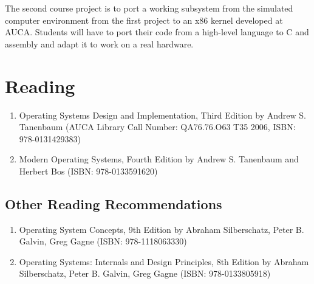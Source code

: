 \documentclass[12pt,a4paper,oneside]{article}
\begin{document}
        The second course project is to port a working subsystem from the
        simulated computer environment from the first project to an x86 kernel
        developed at AUCA. Students will have to port their code from a
        high-level language to C and assembly and adapt it to work on a real
        hardware.

    \section{Reading}
        \begin{enumerate}
            \item Operating Systems Design and Implementation, Third Edition by
            Andrew S.  Tanenbaum (AUCA Library Call Number: QA76.76.O63 T35
            2006, ISBN: 978-0131429383)
            \item Modern Operating Systems, Fourth Edition by Andrew S.
            Tanenbaum and Herbert Bos (ISBN: 978-0133591620)
        \end{enumerate}

        \subsection{Other Reading Recommendations}
            \begin{enumerate}
                \item Operating System Concepts, 9th Edition by Abraham
                Silberschatz, Peter B. Galvin, Greg Gagne (ISBN: 978-1118063330)
                \item Operating Systems: Internals and Design Principles, 8th
                Edition by Abraham Silberschatz, Peter B. Galvin, Greg Gagne
                (ISBN: 978-0133805918)
            \end{enumerate}
\end{document}
